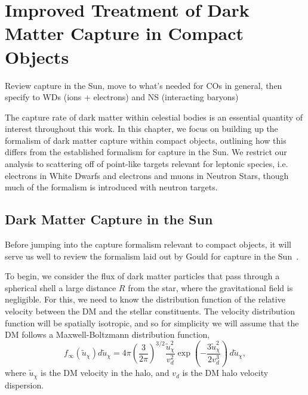 \graphicspath{{img/chapter_3/}}

\chapter{Improved Treatment of Dark Matter Capture in Compact Objects}
\label{chapter:capture_1}

\begin{synopsis}
Review capture in the Sun, move to what's needed for COs in general, then specify to WDs (ions + electrons) and NS (interacting baryons)
\end{synopsis}

The capture rate of dark matter within celestial bodies is an essential quantity of interest throughout this work.
In this chapter, we focus on building up the formalism of dark matter 
capture within compact objects, outlining how this differs from the 
established formalism for capture in the Sun. We restrict our analysis to 
scattering off of point-like targets relevant for leptonic species, 
i.e. electrons in White Dwarfs and electrons and muons in Neutron Stars, though much of the formalism is introduced with neutron targets.



\section{Dark Matter Capture in the Sun}
\label{ch3:sec:solar_capture_full}

Before jumping into the capture formalism relevant to compact objects, it will serve us well to review the formalism laid out by Gould for capture in the Sun~\cite{Gould:1987ju_WeaklyInteractingMassive, Gould:1987ir_ResonantEnhancementsWIMP}. 

To begin, we consider the flux of dark matter particles that pass through a spherical shell a large distance $R$ from the star, where the gravitational field is negligible. For this, we need to know the distribution function of the relative velocity between the DM and the stellar constituents. 
The velocity distribution function will be spatially isotropic, and so for simplicity we will assume that the DM follows a Maxwell-Boltzmann distribution function, 
\begin{equation}
    f_\infty(\tilde{u}_\chi) d\tilde{u}_\chi= 4 \pi \left( \frac{3}{2 \pi} \right)^{3/2}\frac{\tilde{u}_\chi^2}{v_d^2} \exp\left(-\frac{3 \tilde u_\chi^2}{2 v_d^3}\right)\,d\tilde u_\chi, 
\end{equation}
where $\tilde u_\chi$ is the DM velocity in the halo, and $v_d$ is the DM halo velocity dispersion.


